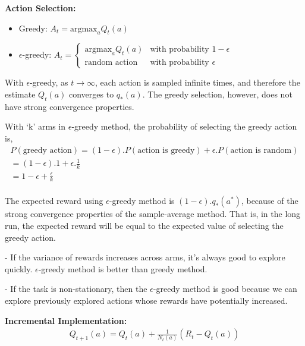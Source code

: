 \textbf{Action Selection:}
\begin{itemize}
    \item  Greedy: $ A_t = \text{argmax}_a Q_t(a) $
    \item  $\epsilon$-greedy: $ A_t = \begin{cases}
        \text{argmax}_a Q_t(a) & \text{with probability } 1 - \epsilon \\
        \text{random action} & \text{with probability } \epsilon
    \end{cases} $
\end{itemize}


With $\epsilon$-greedy, as $t \to \infty$, each action is sampled infinite times, and therefore the estimate $Q_t(a)$ converges to $q_*(a)$. 
The greedy selection, however, does not have strong convergence properties.

With `k' arms in  $\epsilon$-greedy method, the probability of selecting the greedy action is,
\begin{equation}
    \begin{split}
        P(\text{greedy action}) = (1 - \epsilon).P(\text{action is greedy}) + \epsilon.P(\text{action is random}) \\
        = (1 - \epsilon).1 + \epsilon.\frac{1}{k} \\
        = 1 - \epsilon + \frac{\epsilon}{k} \\
        \label{eq:epsilon-greedy}
    \end{split}
\end{equation}

The expected reward using $\epsilon$-greedy method is $(1 - \epsilon).q_*(a^*)$, because of the strong convergence
properties of the sample-average method. That is, in the long run, the expected reward will be equal to the expected
 value of selecting the greedy action.

 - If the variance of rewards increases across arms, it's always good to explore quickly. 
 $\epsilon$-greedy method is better than greedy method.

 - If the task is non-stationary, then the $\epsilon$-greedy method is good because we can explore previously explored
 actions whose rewards have potentially increased.
 \newline

\textbf{Incremental Implementation:}
\begin{equation}
    \begin{split}
        Q_{t+1}(a) = Q_t(a) + \frac{1}{N_t(a)} (R_t - Q_t(a)) \\
        \label{eq:incremental-implementation}
    \end{split}
\end{equation}

